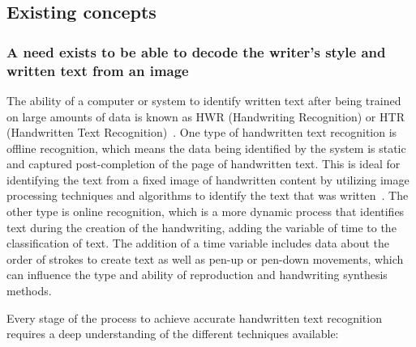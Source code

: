 \label{sec:literature}


\subsection{Existing concepts}
\label{sec:lit-background}

\subsubsection{A need exists to be able to decode the writer's style and written text from an image}
\label{sec:lit-hwr}

The ability of a computer or system to identify written text after being trained on large amounts of data is known as HWR (Handwriting Recognition) or HTR (Handwritten Text Recognition)~\cite[p.~39]{chen2023}.
One type of handwritten text recognition is offline recognition, which means the data being identified by the system is static and captured post-completion of the page of handwritten text. This is ideal for identifying the text from a fixed image of handwritten content by utilizing image processing techniques and algorithms to identify the text that was written~\cite{ma2023}. The other type is online recognition, which is a more dynamic process that identifies text during the creation of the handwriting, adding the variable of time to the classification of text. The addition of a time variable includes data about the order of strokes to create text as well as pen-up or pen-down movements, which can influence the type and ability of reproduction and handwriting synthesis methods.

Every stage of the process to achieve accurate handwritten text recognition requires a deep understanding of the different techniques available:

